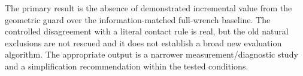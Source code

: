 The primary result is the absence of demonstrated incremental value from the geometric guard over the information-matched full-wrench baseline. The controlled disagreement with a literal contact rule is real, but the old natural exclusions are not rescued and it does not establish a broad new evaluation algorithm. The appropriate output is a narrower measurement/diagnostic study and a simplification recommendation within the tested conditions.
